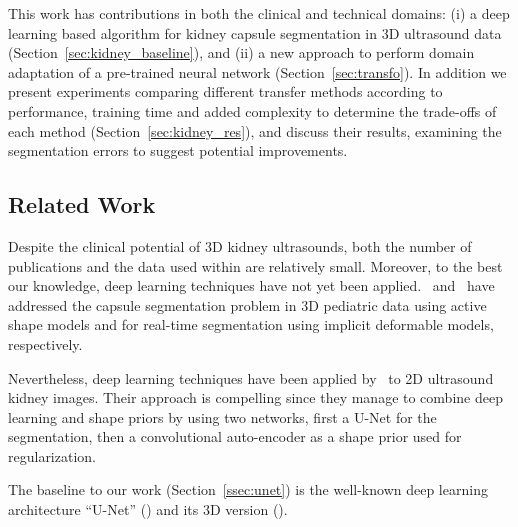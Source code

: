 This work has contributions in both the clinical and technical domains: (i) a deep learning based algorithm for kidney capsule segmentation in 3D ultrasound data (Section~\ref{sec:kidney_baseline}), and (ii) a new approach to perform domain adaptation of a pre-trained neural network (Section~\ref{sec:transfo}). In addition we present experiments comparing different transfer methods according to performance, training time and added complexity to determine the trade-offs of each method (Section~\ref{sec:kidney_res}), and discuss their results, examining the segmentation errors to suggest potential improvements.

\subsection{Related Work}


Despite the clinical potential of 3D kidney ultrasounds, both the number of publications and the data used within are relatively small. Moreover, to the best our knowledge, deep learning techniques have not yet been applied.~\textcite{cerrolaza2014ISBI} and~\textcite{marsousi2017} have addressed the capsule segmentation problem in 3D pediatric data using active shape models and for real-time segmentation using implicit deformable models, respectively. 

Nevertheless, deep learning techniques have been applied by~\textcite{ravishankar2017MICCAI} to 2D ultrasound kidney images. Their approach is compelling since they manage to combine deep learning and shape priors by using two networks, first a U-Net for the segmentation, then a convolutional auto-encoder as a shape prior used for regularization.

The baseline to our work (Section~\ref{ssec:unet}) is the well-known deep learning architecture ``U-Net'' (\textcite{ronneberger2015MICCAI}) and its 3D version (\textcite{cicek2016MICCAI}). 


